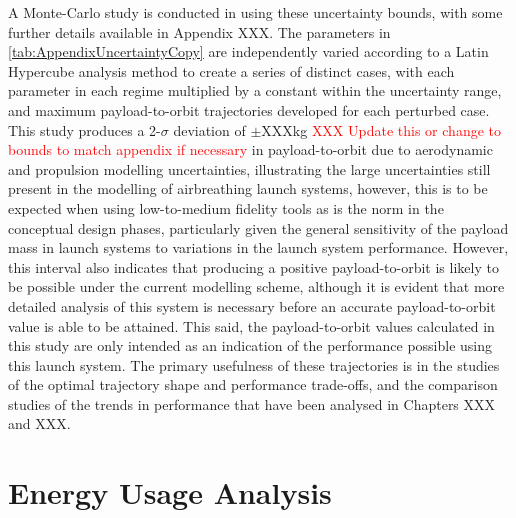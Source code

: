 A Monte-Carlo study is conducted in using these uncertainty bounds, with some further details available in Appendix XXX. The parameters in \ref{tab:AppendixUncertaintyCopy} are independently varied according to a Latin Hypercube analysis method to create a series of distinct cases, with each parameter in each regime multiplied by a constant within the uncertainty range, and maximum payload-to-orbit trajectories developed for each perturbed case. 
This study produces a 2-$\sigma$ deviation of $\pm$XXXkg \textcolor{red}{XXX Update this or change to bounds to match appendix if necessary} in payload-to-orbit due to aerodynamic and propulsion modelling uncertainties, illustrating the large uncertainties still present in the modelling of airbreathing launch systems, however, this is to be expected when using low-to-medium fidelity tools as is the norm in the conceptual design phases, particularly given the general sensitivity of the payload mass in launch systems to variations in the launch system performance. However, this interval also indicates that producing a positive payload-to-orbit is likely to be possible under the current modelling scheme, although it is evident that more detailed analysis of this system is necessary before an accurate payload-to-orbit value is able to be attained. This said, the payload-to-orbit values calculated in this study are only intended as an indication of the performance possible using this launch system. The primary usefulness of these trajectories is in the studies of the optimal trajectory shape and performance trade-offs, and the comparison studies of the trends in performance that have been analysed in Chapters XXX and XXX. 

\section{Energy Usage Analysis}\label{sec:exergy1}




